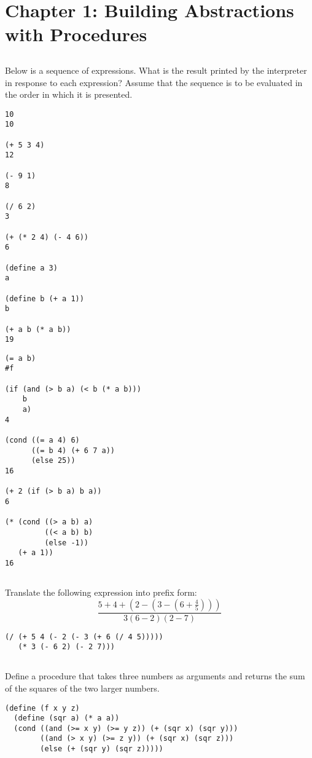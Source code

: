 \documentclass{article}
\begin{document}
\section{Chapter 1: Building Abstractions with Procedures}

\subsection{}
Below is a sequence of expressions. What is the result printed by the interpreter in response to each expression? Assume that the sequence is to be evaluated in the order in which it is presented.
\begin{multicols}{2}
\begin{lstlisting}
10
10

(+ 5 3 4)
12
    
(- 9 1)
8

(/ 6 2)
3

(+ (* 2 4) (- 4 6))
6

(define a 3)
a

(define b (+ a 1))
b

(+ a b (* a b))
19
\end{lstlisting}
\columnbreak
\begin{lstlisting}
(= a b)
#f

(if (and (> b a) (< b (* a b)))
    b
    a)
4

(cond ((= a 4) 6)
      ((= b 4) (+ 6 7 a))
      (else 25))
16

(+ 2 (if (> b a) b a))
6

(* (cond ((> a b) a)
         ((< a b) b)
         (else -1))
   (+ a 1))
16
\end{lstlisting}
\end{multicols}

\subsection{}
Translate the following expression into prefix form:\\
\[ \frac{5 + 4 + (2 - (3 - (6 + \frac{4}{5})))}{3(6 - 2)(2 - 7)} \]
\begin{lstlisting}
(/ (+ 5 4 (- 2 (- 3 (+ 6 (/ 4 5)))))
   (* 3 (- 6 2) (- 2 7)))
\end{lstlisting}

\subsection{}
Define a procedure that takes three numbers as arguments and returns the sum of the squares of the two larger numbers.
\begin{lstlisting}
(define (f x y z)
  (define (sqr a) (* a a))
  (cond ((and (>= x y) (>= y z)) (+ (sqr x) (sqr y)))
        ((and (> x y) (>= z y)) (+ (sqr x) (sqr z)))
        (else (+ (sqr y) (sqr z)))))
\end{lstlisting}
\end{document}
